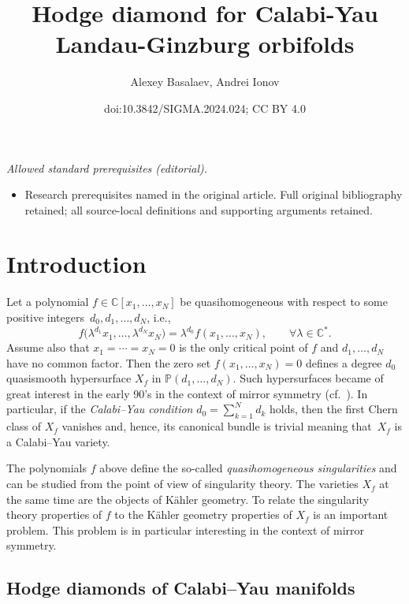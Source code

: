 \documentclass[10pt,a4paper]{amsart}
\title{Hodge diamond for Calabi-Yau Landau-Ginzburg orbifolds}
\author{Alexey Basalaev, Andrei Ionov}
\date{doi:10.3842/SIGMA.2024.024; CC BY 4.0}
\numberwithin{equation}{section}
\newcommand{\CC}{{\mathbb{C}}}
\newcommand{\PP}{{\mathbb{P}}}
\begin{document}
\maketitle
\noindent\textit{Allowed standard prerequisites (editorial).}\begin{itemize}
\item Research prerequisites named in the original article. Full original bibliography retained; all source-local definitions and supporting arguments retained.
\end{itemize}\medskip
\section{Introduction}

Let a polynomial $f \in \CC[x_1,\dots,x_N]$ be quasihomogeneous with respect to some positive integers~${d_0,d_1,\dots,d_N}$, i.e.,
\[
	f\bigl(\lambda^{d_1}x_1,\dots,\lambda^{d_N}x_N\bigr) = \lambda^{d_0} f(x_1,\dots,x_N), \qquad \forall \lambda \in \CC^\ast.
\]
Assume also that $x_1=\cdots=x_N = 0$ is the only critical point of $f$ and $d_1,\dots,d_N$ have no common factor. Then the zero set ${f(x_1,\dots,x_N)=0}$ defines a degree $d_0$ quasismooth hypersurface $X_f$ in $\PP(d_1,\dots,d_N)$. Such hypersurfaces became of great interest in the early 90's in the context of mirror symmetry (cf.~\cite{BH95,BH93}). In particular, if the \textit{Calabi--Yau condition} $d_0 = \sum_{k=1}^N d_k$ holds, then the first Chern class of $X_f$ vanishes and, hence, its canonical bundle is trivial meaning that~$X_f$ is a Calabi--Yau variety.

The polynomials $f$ above define the so-called \textit{quasihomogeneous singularities} and can be studied from the point of view of singularity theory. The varieties $X_f$ at the same time are the objects of K\"ahler geometry. To relate the singularity theory properties of $f$ to the K\"ahler geometry properties of $X_f$ is an important problem. This problem is in particular interesting in the context of mirror symmetry.

\subsection{Hodge diamonds of Calabi--Yau manifolds}
\end{document}
